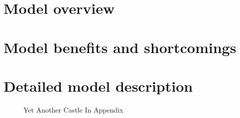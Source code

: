 \documentclass{template/openetcs_report}
\begin{document}
\chapter{Model overview}
\chapter{Model benefits and shortcomings}
\chapter{Detailed model description}

\begin{figure}
  \centering
  \caption{Yet Another Castle In Appendix}
  \label{fig:castle2}
\end{figure}

\end{document}
